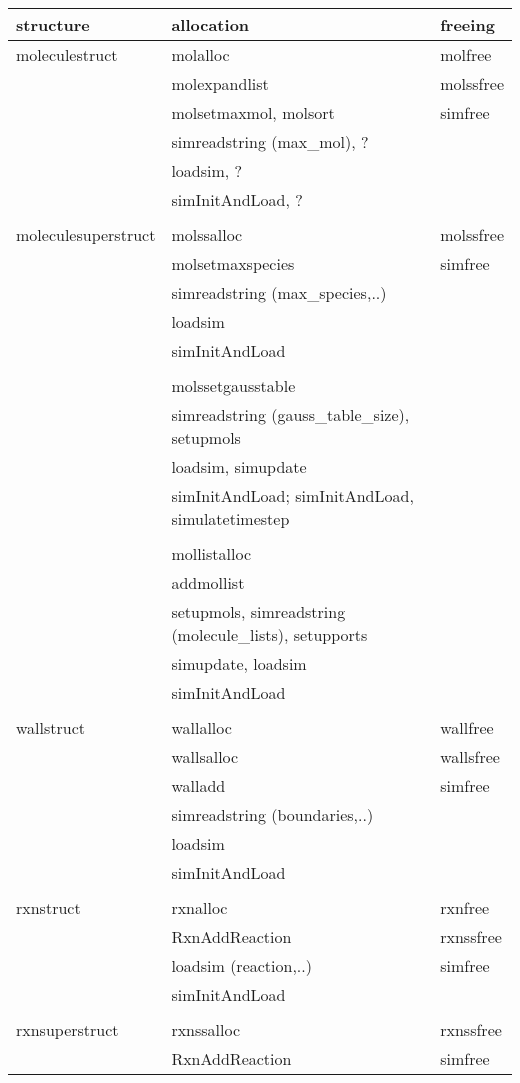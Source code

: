 \documentclass {book}
\begin{document}
\begin{ttfamily}
\begin{longtable}[c]{lll}
structure&allocation&freeing\\
\hline
moleculestruct&molalloc&molfree\\
&molexpandlist&molssfree\\
&molsetmaxmol, molsort&simfree\\
&simreadstring (max\_mol), ?\\
&loadsim, ?\\
&simInitAndLoad, ?\\
\\
moleculesuperstruct&molssalloc&molssfree\\
&molsetmaxspecies&simfree\\
&simreadstring (max\_species,..)\\
&loadsim\\
&simInitAndLoad\\
\\
&molssetgausstable\\
&simreadstring (gauss\_table\_size), setupmols\\
&loadsim, simupdate\\
&simInitAndLoad; simInitAndLoad, simulatetimestep\\
\\
&mollistalloc\\
&addmollist\\
&setupmols, simreadstring (molecule\_lists), setupports\\
&simupdate, loadsim\\
&simInitAndLoad\\
\\
wallstruct&wallalloc&wallfree\\
&wallsalloc&wallsfree\\
&walladd&simfree\\
&simreadstring (boundaries,..)\\
&loadsim\\
&simInitAndLoad\\
\\
rxnstruct&rxnalloc&rxnfree\\
&RxnAddReaction&rxnssfree\\
&loadsim (reaction,..)&simfree\\
&simInitAndLoad\\
\\
rxnsuperstruct&rxnssalloc&rxnssfree\\
&RxnAddReaction&simfree\\

\end{longtable}
\end{ttfamily}
\end{document}
